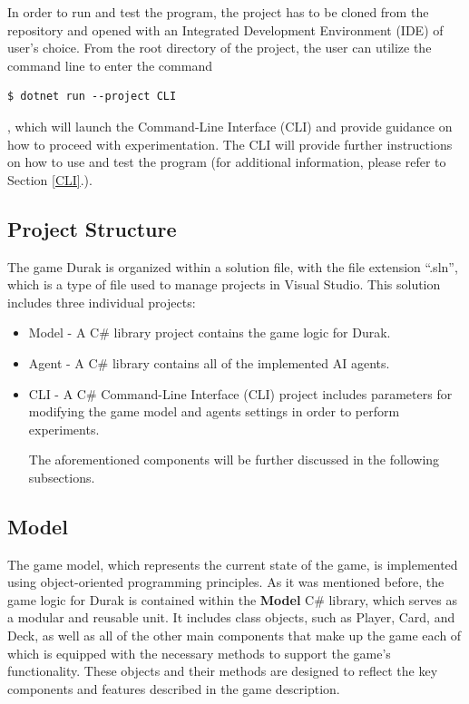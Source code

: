 In order to run and test the program, the project has to be cloned from the repository and opened with an Integrated Development Environment (IDE) of user's choice. From the root directory of the project, the user can utilize the command line to enter the command 
\begin{lstlisting}
$ dotnet run --project CLI
\end{lstlisting}
, which will launch the Command-Line Interface (CLI) and provide guidance on how to proceed with experimentation. The CLI will provide further instructions on how to use and test the program (for additional information, please refer to Section \ref{CLI}.).

\subsection{Project Structure}
The game Durak is organized within a solution file, with the file extension ``.sln'', which is a type of file used to manage projects in Visual Studio. This solution includes three individual projects: 

\begin{itemize}

\item Model - A C\# library project contains the game logic for Durak.

\item Agent - A C\# library contains all of the implemented AI agents.

\item CLI - A C\# Command-Line Interface (CLI) project includes parameters for modifying the game model and agents settings in order to perform experiments.

The aforementioned components will be further discussed in the following subsections.

\end{itemize}

\subsection{Model}

The game model, which represents the current state of the game, is implemented using object-oriented programming principles. As it was mentioned before, the game logic for Durak is contained within the \textbf{Model} C\# library, which serves as a modular and reusable unit. It includes class objects, such as Player, Card, and Deck, as well as all of the other main components that make up the game each of which is equipped with the necessary methods to support the game's functionality. These objects and their methods are designed to reflect the key components and features described in the game description.

